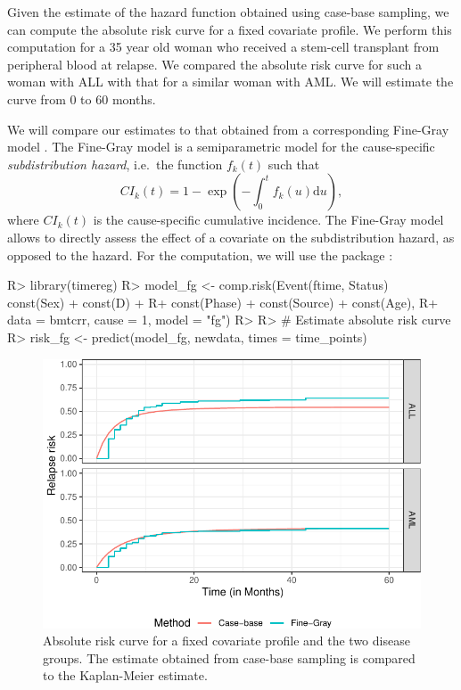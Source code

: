 \documentclass[
]{jss}
\begin{document}
Given the estimate of the hazard function obtained using case-base
sampling, we can compute the absolute risk curve for a fixed covariate
profile. We perform this computation for a 35 year old woman who
received a stem-cell transplant from peripheral blood at relapse. We
compared the absolute risk curve for such a woman with ALL with that for
a similar woman with AML. We will estimate the curve from 0 to 60
months.

We will compare our estimates to that obtained from a corresponding
Fine-Gray model \citeyearpar{fine1999proportional}. The Fine-Gray model
is a semiparametric model for the cause-specific \emph{subdistribution
hazard}, i.e.~the function \(f_k(t)\) such that
\[CI_k(t) =1 - \exp\left( - \int_0^t f_k(u) \textrm{d}u \right),\] where
\(CI_k(t)\) is the cause-specific cumulative incidence. The Fine-Gray
model allows to directly assess the effect of a covariate on the
subdistribution hazard, as opposed to the hazard. For the computation,
we will use the  package \citep{timereg}:

\begin{CodeChunk}

\begin{CodeInput}
R> library(timereg)
R> model_fg <- comp.risk(Event(ftime, Status) ~ const(Sex) + const(D) +
R+                         const(Phase) + const(Source) + const(Age),
R+                       data = bmtcrr, cause = 1, model = "fg")
R> 
R> # Estimate absolute risk curve
R> risk_fg <- predict(model_fg, newdata, times = time_points)
\end{CodeInput}
\end{CodeChunk}

\begin{CodeChunk}
\begin{figure}

{\centering \includegraphics[width=\textwidth,keepaspectratio=true]{../figures/bmtcrr-risk-1} 

}

\caption{\label{fig:compAbsrisk} Absolute risk curve for a fixed covariate profile and the two disease groups. The estimate obtained from case-base sampling is compared to the Kaplan-Meier estimate.}\label{fig:bmtcrr-risk}
\end{figure}
\end{CodeChunk}
\end{document}

